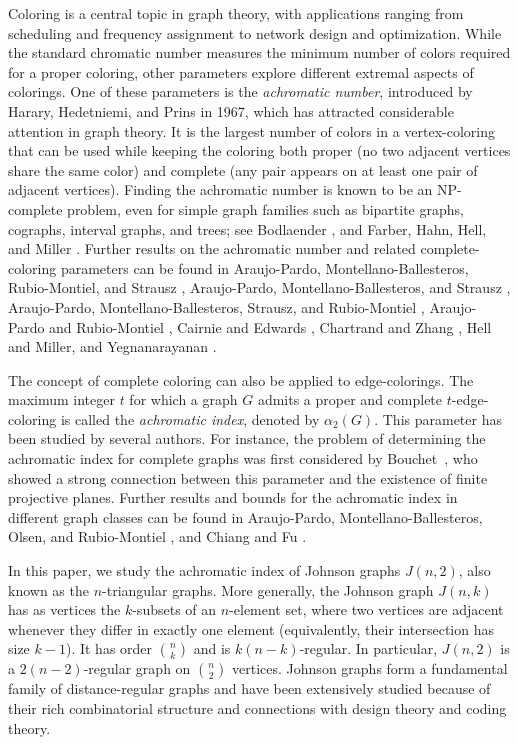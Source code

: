 \documentclass{article}
\begin{document}
Coloring is a central topic in graph theory, with applications ranging from scheduling and frequency assignment to network design and optimization. While the standard %
chromatic number measures the minimum number of colors required for a proper coloring, other parameters explore different extremal aspects of colorings. One of these parameters is the \emph{achromatic number}, introduced by Harary, Hedetniemi, and Prins \cite{hhp67} in 1967, which has attracted considerable attention in graph theory. It is the largest number of colors in a vertex-coloring that can be used while keeping the coloring both proper (no two adjacent vertices share the same color) and complete (any pair appears on at least one pair of adjacent vertices). Finding the achromatic number is known to be an NP-complete problem, even for simple graph families such as bipartite graphs, cographs, interval graphs, and trees; see 
Bodlaender \cite{b89}, and Farber, Hahn, Hell, and Miller  \cite{fhhm86}.
Further results on the achromatic number and related complete-coloring
parameters can be found in
Araujo-Pardo, Montellano-Ballesteros, Rubio-Montiel, and Strausz \cite{apms18}, 
Araujo-Pardo, Montellano-Balles\-teros, and Strausz \cite{apms11},
Araujo-Pardo, Montellano-Ballesteros, Strausz, and Rubio-Montiel \cite{apmsr14}, 
Araujo-Pardo and Rubio-Montiel \cite{apr18}, 
Cairnie and Edwards \cite{ce97}, 
Chartrand and Zhang \cite{cz09}, 
Hell and Miller\cite{hm76}, and 
Yegnanarayanan \cite{y01}.

The concept of complete coloring can also be applied to edge-colorings. The maximum integer $t$ for which a graph $G$ admits a proper and complete $t$-edge-coloring is called the \emph{achromatic index}, denoted by $\alpha_2(G)$. This parameter has been studied by several authors. For instance, the problem of determining the achromatic index for complete graphs was first considered by Bouchet~\cite{b78}, who showed a strong connection between this parameter and the existence of finite projective planes. Further results and bounds for the achromatic index in different graph classes can be found in Araujo-Pardo, Montellano-Ballesteros, Olsen, and Rubio-Montiel \cite{amor21}, and Chiang and Fu \cite{cf95}.

In this paper, we study the achromatic index of Johnson graphs $J(n,2)$, also known as the $n$-triangular graphs. More generally, the Johnson graph $J(n,k)$ has as vertices the $k$-subsets of an $n$-element set, where two vertices are adjacent whenever they differ in exactly one element (equivalently, their intersection has size $k-1$). It has order $\binom{n}{k}$ and is $k(n-k)$-regular. In particular, $J(n,2)$ is a $2(n-2)$-regular graph on $\binom{n}{2}$ vertices. Johnson graphs form a fundamental family of distance-regular graphs and have been extensively studied because of their rich combinatorial structure and connections with design theory and coding theory.
\end{document}
